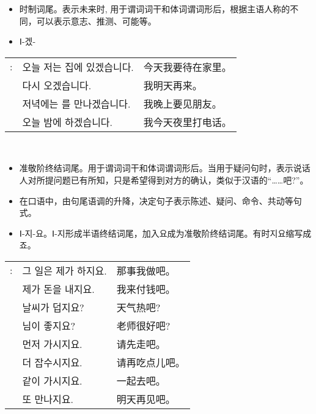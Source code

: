 \begin{grammar}
    \begin{grammarsect}[-겠-]
    \begin{itemize}
        \item 时制词尾。表示未来时, 用于谓词词干和体词谓词形后，根据主语人称的不同，可以表示意志、推测、可能等。
        \item {\color{gray} Ⅰ-겠-}
    \end{itemize}
    \begin{tabular}{lll}
        \ruby{例}{예}: &오늘 저는 집에 있겠습니다. &今天我要待在家里。\\
        &\ruby{來日}{내일} 다시 오겠습니다.&我明天再来。\\
        &저녁에는 \ruby{親舊}{친구}를 만나겠습니다.&我晚上要见朋友。\\
        &오늘 밤에 \ruby{電話}{전화}하겠습니다.&我今天夜里打电话。
    \end{tabular}\\
    \end{grammarsect}
    \begin{grammarsect}[-지요]
        \begin{itemize}
            \item 准敬阶终结词尾。用于谓词词干和体词谓词形后。当用于疑问句时，表示说话人对所提问题已有所知，只是希望得到对方的确认，类似于汉语的“……吧?”。
            \item 在口语中，由句尾语调的升降，决定句子表示陈述、疑问、命令、共动等句式。
            \item {\color{gray} Ⅰ-지-요。Ⅰ-지形成半语终结词尾，加入요成为准敬阶终结词尾。有时지요缩写成죠。} 
        \end{itemize}
        \begin{tabular}{lll}
            \ruby{例}{예}: &그 일은 제가 하지요.&那事我做吧。\\
            &제가 돈을 내지요.&我来付钱吧。 \\
            &날씨가 덥지요?&天气热吧? \\
            &\ruby{先生}{선생}님이 좋지요?&老师很好吧? \\
            &먼저 가시지요.&请先走吧。\\
            &더 잡수시지요.&请再吃点儿吧。\\
            &같이 가시지요.&一起去吧。\\
            &\ruby{來日}{내일} 또 만나지요.&明天再见吧。\\
        \end{tabular}\\
    \end{grammarsect}
\end{grammar}
